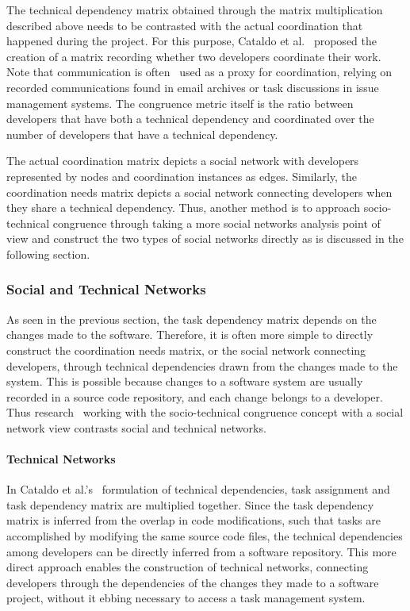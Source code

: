 The technical dependency matrix obtained through the matrix multiplication described above needs to be contrasted with the actual coordination that happened during the project.
For this purpose, Cataldo et al.~\cite{cataldo:cscw:2006} proposed the creation of a matrix recording whether two developers coordinate their work.
Note that communication is often~\cite{cataldo:cscw:2006,kwan:tse:2011,valetto:msr:2007,ducheneaut:cscw:2005,ehrlich:stc:2008,wolf:icse:2009} used as a proxy for coordination,  relying on recorded communications found in email archives or task discussions in issue management systems.
The congruence metric itself is the ratio between developers that have both a technical dependency and coordinated over the number of developers that have a technical dependency.

The actual coordination matrix depicts a social network with developers represented by nodes and coordination instances as edges.
Similarly, the coordination needs matrix depicts a social network connecting developers when they share a technical dependency.
Thus, another method is to approach socio-technical congruence through taking a more social networks analysis point of view and construct the two types of social networks directly as is discussed in the following section.

\subsubsection{Social and Technical Networks}
As seen in the previous section, the task dependency matrix depends on the changes made to the software. 
Therefore, it is often more simple to directly construct the coordination needs matrix, or the social network connecting developers, through technical dependencies drawn from the changes made to the system.
%
This is possible because changes to a software system are usually recorded in a source code repository, and each change belongs to a developer.
Thus research~\cite{cataldo:cscw:2006,kwan:tse:2011,valetto:msr:2007,ducheneaut:cscw:2005,ehrlich:stc:2008} working with the socio-technical congruence concept with a social network view contrasts social and technical networks.

\paragraph{Technical Networks}
In Cataldo et al.'s~\cite{cataldo:cscw:2006} formulation of technical dependencies, task assignment and task dependency matrix are multiplied together.
Since the task dependency matrix is inferred from the overlap in code modifications, such that tasks are accomplished by modifying the same source code files, the technical dependencies among developers can be directly inferred from a software repository.
This more direct approach enables the construction of technical networks, connecting developers through the dependencies of the changes they made to a software project, without it ebbing necessary to access a task management system.

